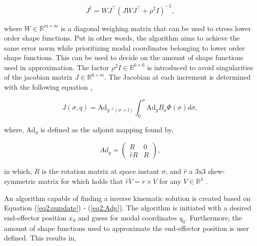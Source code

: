 \begin{equation}
    J^\dagger = WJ^\top(JWJ^\top + \rho^2 I)^{-1}
    \label{eq2:pseudoinverse},
\end{equation}

where $W \in \mathbb{R}^{m\times m}$ is a diagonal weighing matrix that can be used to stress lower order shape functions. Put in other words, the algorithm aims to achieve the same error norm while prioritizing modal coordinates belonging to lower order shape functions. This can be used to decide on the amount of shape functions used in approximation. The factor $\rho^2 I \in \mathbb{R}^{6 \times 6}$ is introduced to avoid singularities of the jacobian matrix $J \in \mathbb{R}^{6 \times m}$. The Jacobian at each increment is determined with the following equation \cite{Caasenbrood2020},

\begin{equation}
J(\sigma,q)= \text{Ad}_{g^{-1}(\sigma = l)} \int_{0}^{\sigma} \text{Ad}_g B_a \Phi(\sigma) d\sigma ,
\end{equation}

where, $\text{Ad}_g$ is defined as the adjoint mapping found by,


\begin{equation}
    Ad_g = \begin{pmatrix} R & 0 \\ \hat{r}R & R \end{pmatrix},
    \label{eq2:Adg}
\end{equation}

in which, $R$ is the rotation matrix at space instant $\sigma$, and $\hat{r}$ a 3x3 skew-symmetric matrix for which holds that $\hat{r}V = r \times V$ for any $V \in \mathbb{R}^3$ \cite{Boyer2019}.

An algorithm capable of finding a inverse kinematic solution is created based on Equation (\ref{eq2:qupdate}) - (\ref{eq2:Adg}). The algorithm is initiated with a desired end-effector position $x_d$ and guess for modal coordinates $q_0$. Furthermore, the amount of shape functions used to approximate the end-effector position is user defined. This results in,


